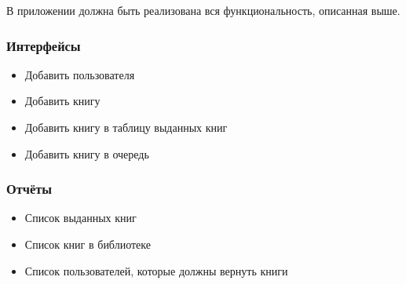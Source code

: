 \documentclass[a4paper,10pt]{article}
\begin{document}
             
            В приложении должна быть реализована вся функциональность, описанная выше.

            \subsubsection{Интерфейсы}


                \begin{itemize}
                    \item Добавить пользователя
                    \item Добавить книгу
                    \item Добавить книгу в таблицу выданных книг
                    \item Добавить книгу в очередь
                \end{itemize}

            \subsubsection{Отчёты}


                \begin{itemize}
                    \item Список выданных книг
                    \item Список книг в библиотеке
                    \item Список пользователей, которые должны вернуть книги
                \end{itemize}
\end{document}
